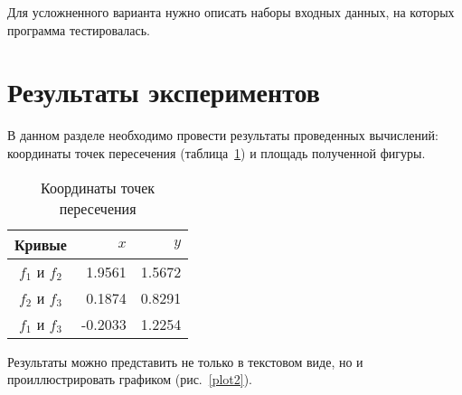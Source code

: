 \documentclass[a4paper,12pt,titlepage,final]{article}
\begin{document}
Для усложненного варианта нужно описать наборы входных данных, на которых
программа тестировалась.

\newpage

\section{Результаты экспериментов}

В данном разделе необходимо провести результаты проведенных вычислений:
координаты точек пересечения (таблица~\ref{table1}) и площадь полученной фигуры.

\begin{table}[h]
\centering
\begin{tabular}{crr}
\toprule
Кривые & $x$ & $y$ \\
\midrule
$f_1$ и $f_2$ &  1.9561 & 1.5672 \\
$f_2$ и $f_3$ &  0.1874 & 0.8291 \\
$f_1$ и $f_3$ & -0.2033 & 1.2254 \\
\bottomrule
\end{tabular}
\caption{Координаты точек пересечения}
\label{table1}
\end{table}


Результаты можно представить не только в текстовом виде, но и 
проиллюстрировать графиком (рис.~\ref{plot2}).
\end{document}
